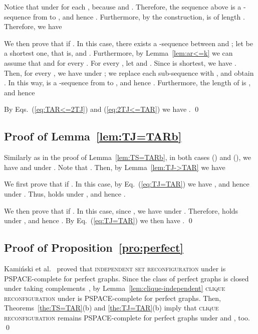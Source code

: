 \documentclass{llncs}
\newcounter{one}
\newcommand{\one}{{\rm \roman{one}}}
\newcounter{two}
\newcommand{\two}{{\rm \roman{two}}}
\begin{document}
	Notice that  under  for each , because  and .
	Therefore, the sequence  above is a -sequence from  to , and hence . 
	Furthermore, by the construction,  is of length .
	Therefore, we have 
	
	
	We then prove that  if .
	In this case, there exists a -sequence between  and ; 
let  be a shortest one, that is,  and .
	Furthermore, by Lemma~\ref{lem:ar<=k} we can assume that  and  for every . 
	For every , let  and .
	Since  is shortest, we have .
	Then, for every , we have  under ;
we replace each sub-sequence  with , and obtain .
	In this way,  is a -sequence from  to , and hence . 
	Furthermore, the length of  is , and hence 
	

	By Eqs.~(\ref{eq:TAR<=2TJ}) and (\ref{eq:2TJ<=TAR}) we have .
	\qed


	
	
	
	\subsection{Proof of Lemma~\ref{lem:TJ=TARb}}
Similarly as in the proof of Lemma~\ref{lem:TS=TARb}, in both cases (\one) and (\two), we have  and  under .
	Note that . 
	Then, by Lemma~\ref{lem:TJ->TAR} we have
	
	
	We first prove that  if .
	In this case, by Eq.~(\ref{eq:TJ=TAR}) we have , and hence  under .
	Thus,  holds under , and hence . 
	
	We then prove that  if .
	In this case, since , we have  under .
	Therefore,  holds under , and hence . 
	By Eq.~(\ref{eq:TJ=TAR}) we then have .
\qed




	\subsection{Proof of Proposition~\ref{pro:perfect}}
Kami\'nski et al.~\cite[Theorem~3]{KaminskiMM12} proved that \textsc{independent set reconfiguration} under  is PSPACE-complete for perfect graphs.
	Since the class of perfect graphs is closed under taking complements~\cite{Lovasz72}, by Lemma~\ref{lem:clique-independent} \textsc{clique reconfiguration} under  is PSPACE-complete for perfect graphs.
	Then, Theorems~\ref{the:TS=TAR}(b) and \ref{the:TJ=TAR}(b) imply that \textsc{clique reconfiguration} remains PSPACE-complete for perfect graphs under  and , too.
	\qed
\end{document}
